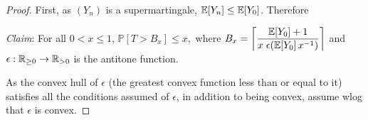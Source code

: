 \begin{proof}
First, as $(Y_n)$ is a supermartingale, $\mathbb{E}[Y_n] \leq \mathbb{E}[Y_0]$. 
Therefore
\begin{calculation}
\end{calculation}

\emph{Claim}: For all $0 < x \leq 1$, 
\(
\mathbb P[T > B_x] \leq x,
\)
where $B_x = \left \lceil \dfrac{\mathbb{E}[Y_0]+1}{x \; \epsilon(\mathbb{E}[Y_0] \, x^{-1})} \right \rceil$ and $\epsilon : \mathbb{R}_{{\geq}0} \to \mathbb{R}_{{>}0}$ is the antitone function. 

\smallskip

As the convex hull of $\epsilon$ (the greatest convex function less than or equal to it) satisfies all the conditions assumed of $\epsilon$, in addition to being convex, assume wlog that $\epsilon$ is convex.


\end{proof}
